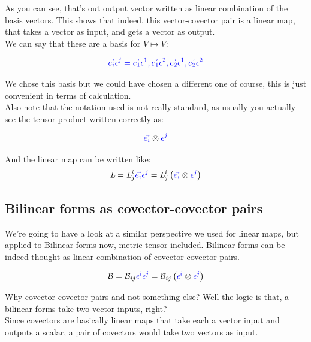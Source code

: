 As you can see, that's out output vector written as linear combination of the basis vectors.
This shows that indeed, this vector-covector pair is a linear map, that takes a vector as input, and gets a vector as output.\\

We can say that these are a basis for $V \mapsto V$:

\begin{equation}
    {\color{blue} \vec{e_i}\epsilon^j = \vec{e_1} \epsilon^1,  \vec{e_1} \epsilon^2,  \vec{e_2} \epsilon^1, \vec{e_2} \epsilon^2}
\end{equation}

We chose this basis but we could have chosen a different one of course, this is just convenient in terms of calculation.\\
Also note that the notation used is not really standard, as usually you actually see the tensor product 
written correctly as:

\begin{equation}
    \begingroup\color{blue} \vec{e_i}\endgroup \otimes \begingroup\color{blue}\epsilon^j \endgroup
\end{equation}

And the linear map can be written like:
\begin{equation}
    \textit{L} = \textit{L}^i_j \begingroup\color{blue} \vec{e_i} \epsilon^j\endgroup = \textit{L}^i_j \left(\begingroup\color{blue} \vec{e_i}\endgroup \otimes \begingroup\color{blue}\epsilon^j \endgroup\right)
\end{equation}



\subsection{Bilinear forms as covector-covector pairs}

We're going to have a look at a similar perspective we used for linear maps, but applied to Bilinear forms now, metric tensor included.
Bilinear forms can be indeed thought as linear combination of covector-covector pairs.

\begin{equation}
    \mathcal{B} = \mathcal{B}_{ij} \begingroup\color{blue} \epsilon^i \epsilon^j\endgroup = \mathcal{B}_{ij} \left(\begingroup\color{blue} \epsilon^i\endgroup \otimes \begingroup\color{blue}\epsilon^j \endgroup\right)
\end{equation}

Why covector-covector pairs and not something else? Well the logic is that, a bilinear forms take two vector inputs, right?\\
Since covectors are basically linear maps that take each a vector input and outputs a scalar, a pair of covectors
would take two vectors as input.\\

